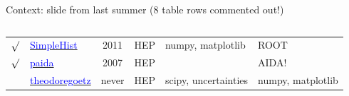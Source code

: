 \documentclass[aspectratio=169]{beamer}
\begin{document}
\begin{frame}{Context: slide from last summer (8 table rows commented out!)}
\begin{columns}
\begin{tabular}{c l c p{2.7 cm} p{1.5 cm} p{4.75 cm}}
$\surd$ & \href{https://pypi.python.org/pypi/SimpleHist}{\textcolor{blue}{SimpleHist}} & 2011 & HEP & numpy, matplotlib & ROOT \\
$\surd$ & \href{https://pypi.org/project/paida}{\textcolor{blue}{paida}} & 2007 & HEP & & AIDA! \\
& \href{https://github.com/theodoregoetz/histogram}{\textcolor{blue}{theodoregoetz}} & never & HEP & scipy, \mbox{uncertainties} & numpy, matplotlib \\
\end{tabular}
\end{columns}
\end{frame}
\end{document}
